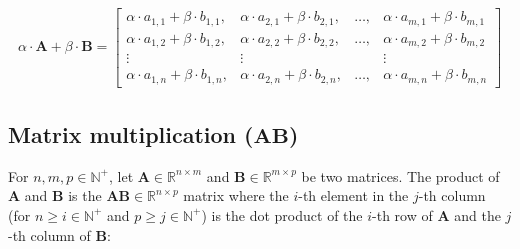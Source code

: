 \documentclass{article}
\begin{document}
        \begin{align*}
          \alpha \cdot \mathbf{A} + \beta \cdot \mathbf{B}
            = \begin{bmatrix}
                \alpha \cdot a_{1,1} + \beta \cdot b_{1,1},
                  & \alpha \cdot a_{2,1} + \beta \cdot b_{2,1},
                  & \ldots,
                  & \alpha \cdot a_{m,1} + \beta \cdot b_{m,1} \\
                \alpha \cdot a_{1,2} + \beta \cdot b_{1,2},
                  & \alpha \cdot a_{2,2} + \beta \cdot b_{2,2},
                  & \ldots,
                  & \alpha \cdot a_{m,2} + \beta \cdot b_{m,2} \\
                \vdots & \vdots & & \vdots \\
                \alpha \cdot a_{1,n} + \beta \cdot b_{1,n},
                  & \alpha \cdot a_{2,n} + \beta \cdot b_{2,n},
                  & \ldots,
                  & \alpha \cdot a_{m,n} + \beta \cdot b_{m,n}
              \end{bmatrix}
        \end{align*}

      \subsection{Matrix multiplication ($\mathbf{AB}$)}

        For $n, m, p \in \mathbb{N}^+$, let
        $\mathbf{A} \in \mathbb{R}^{n \times m}$ and
        $\mathbf{B} \in \mathbb{R}^{m \times p}$ be two matrices.
        The product of $\mathbf{A}$ and $\mathbf{B}$ is the
        $\mathbf{AB} \in \mathbb{R}^{n \times p}$ matrix where the $i$-th
        element in the $j$-th column (for $n \geq i \in \mathbb{N}^+$ and
        $p \geq j \in \mathbb{N}^+$) is the dot product of the $i$-th row
        of $\mathbf{A}$ and the $j$-th column of $\mathbf{B}$:
\end{document}
